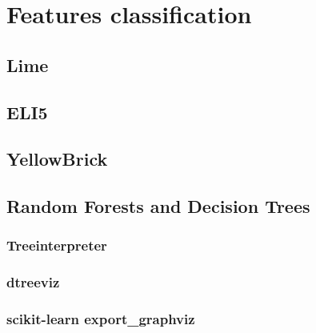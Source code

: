 \chapter{Features classification}

\section{Lime}

\section{ELI5}

\section{YellowBrick}

\section{Random Forests and Decision Trees}
\subsection{Treeinterpreter}

\subsection{dtreeviz}

\subsection{scikit-learn export\_graphviz}